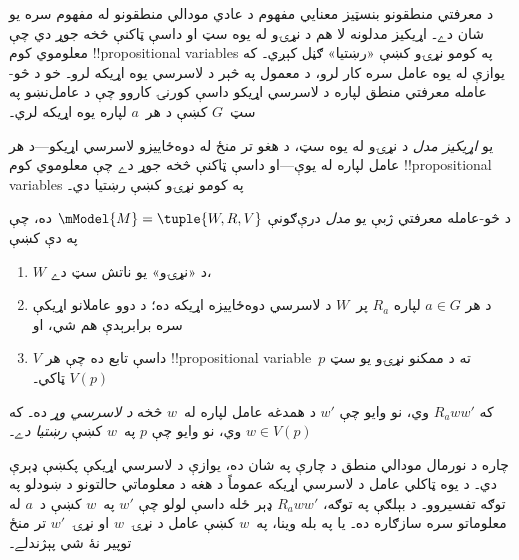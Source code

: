 \documentclass[../../../include/open-logic-section]{subfiles}
\begin{document}


د معرفتي منطقونو بنسټيز معنايي مفهوم د عادي مودالي منطقونو له مفهوم سره
يو شان دے۔ اړيکيز مدلونه لا هم د نړۍو له يوه سټ او داسې ټاکنې څخه جوړ
دي چې معلوموي کوم !!{propositional
variable}s په کومو نړۍو کښې «رښتيا» ګڼل کېږي۔ که يوازې له يوه عامل
سره کار لرو، د معمول په څېر د لاسرسي يوه اړيکه لرو۔ خو د څو-عامله
معرفتي منطق لپاره د لاسرسي اړيکو داسې کورنۍ کاروو چې
د عامل‌نښو په سټ~$G$ کښې د هر~$a$ لپاره يوه اړيکه لري۔

يو \emph{اړيکيز مدل} د نړۍو له يوه سټ، د هغو تر منځ له دوه‌ځاييزو
لاسرسي اړيکو—د هر عامل لپاره له يوې—او داسې ټاکنې څخه جوړ دے چې
معلوموي کوم !!{propositional variable}s په کومو نړۍو کښې رښتيا دي۔

\begin{defn}
  د څو-عامله معرفتي ژبې يو \emph{مدل} درې‌ګونې
  $\mModel{M} = \tuple{W, R, V}$ ده، چې په دې کښې
  \begin{enumerate}
  \item $W$ د «نړۍو» يو ناتش سټ دے،
  \item د هر $a \in G$ لپاره ${R}_a$ پر~$W$ د لاسرسي دوه‌ځاييزه
  اړيکه ده؛ د دوو عاملانو اړيکې سره برابرېدې هم شي، او
  \item $V$ داسې تابع ده چې هر !!{propositional
    variable}~$p$ ته د ممکنو نړۍو يو سټ $V(p)$ ټاکي۔
  \end{enumerate}
  که $R_a ww'$ وي، نو وايو چې $w'$ د همدغه عامل لپاره
  له~$w$ څخه \emph{د لاسرسي وړ} ده۔ که $w \in V(p)$ وي، نو وايو چې
  $p$ په~$w$ کښې \emph{رښتيا دے}۔
\end{defn}

چاره د نورمال مودالي منطق د چارې په شان ده، يوازې د لاسرسي اړيکې
پکښې ډېرې دي۔ د يوه ټاکلي عامل د لاسرسي اړيکه عموماً د هغه د
معلوماتي حالتونو د ښودلو په توګه تفسيروو۔ د بېلګې په توګه،
$R_a ww'$ ډېر ځله داسې لولو چې $w'$ په~$w$ کښې د~$a$ له
معلوماتو سره سازګاره ده۔ يا په بله وينا، په~$w$ کښې عامل د
نړۍ~$w$ او نړۍ~$w'$ تر منځ توپير نۀ شي پېژندلے۔
\end{document}
